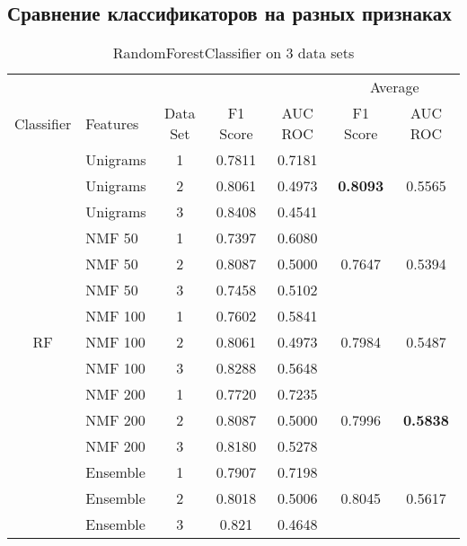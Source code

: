 \documentclass[12pt, twoside]{article}
\title
    {Бинарная классификация движения цен по новостному потоку}
\author
    {Борисов Александр} %
\begin{document}
\maketitle

\subsection{Сравнение классификаторов на разных признаках}

\begin{table}[!htbp]
  \centering
  \begin{tabular}{clccccc}
  \toprule
  {} & {} &	{}	& {}	&	{} & \multicolumn{2}{c}{Average} \\
  \cmidrule(r){6-7}
  Classifier	&	Features	&	Data Set	&	F1 Score	&	AUC ROC	&	F1 Score	&	AUC ROC \\
  \midrule
  	&	Unigrams	&	1	&	0.7811	&	0.7181	&		&	 \\
  	&	Unigrams	&	2	&	0.8061	&	0.4973	&	\textbf{0.8093}	&	0.5565 \\
  	&	Unigrams	&	3	&	0.8408	&	0.4541	&		&	 \\
  	\cmidrule(r){2-7}
  	&	NMF 50	&	1	&	0.7397	&	0.6080	&		&	 \\
  	&	NMF 50	&	2	&	0.8087	&	0.5000	&	0.7647	&	0.5394 \\
  	&	NMF 50	&	3	&	0.7458	&	0.5102	&		&	 \\
  	\cmidrule(r){2-7}
  	&	NMF 100	&	1	&	0.7602	&	0.5841	&		&	 \\
  RF	&	NMF 100	&	2	&	0.8061	&	0.4973	&	0.7984	&	0.5487 \\
  	&	NMF 100	&	3	&	0.8288	&	0.5648	&		&	 \\
  	\cmidrule(r){2-7}
  	&	NMF 200	&	1	&	0.7720	&	0.7235	&		&	 \\
  	&	NMF 200	&	2	&	0.8087	&	0.5000	&	0.7996	&	\textbf{0.5838} \\
  	&	NMF 200	&	3	&	0.8180	&	0.5278	&		&	 \\
  	\cmidrule(r){2-7}
  	&	Ensemble	&	1	&	0.7907	&	0.7198	&		&	 \\
  	&	Ensemble	&	2	&	0.8018	&	0.5006	&	0.8045	&	0.5617 \\
  	&	Ensemble	&	3	&	0.821	&	0.4648	&		&	 \\
  \bottomrule
  \end{tabular}
  \caption{RandomForestClassifier on 3 data sets}
\end{table}
\end{document}

